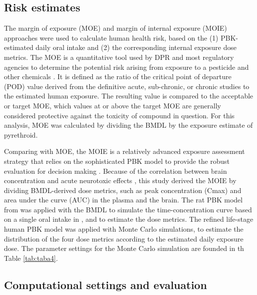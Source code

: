 \documentclass[toxics,article,submit,pdftex,moreauthors]{Definitions/mdpi}
\begin{document}
\subsection{Risk estimates}\label{risk-estimates}

The margin of exposure (MOE) and margin of internal exposure (MOIE)
approaches were used to calculate human health risk, based on the (1)
PBK-estimated daily oral intake and (2) the corresponding internal
exposure dose metrics. The MOE is a quantitative tool used by DPR and
most regulatory agencies to determine the potential risk arising from
exposure to a pesticide and other chemicals
\citep{beaudouin2010stochastic, beauvais_human_2010}. It is defined as
the ratio of the critical point of departure (POD) value derived from
the definitive acute, sub-chronic, or chronic studies to the estimated
human exposure. The resulting value is compared to the acceptable or
target MOE, which values at or above the target MOE are generally
considered protective against the toxicity of compound in question. For
this analysis, MOE was calculated by dividing the BMDL by the exposure
estimate of pyrethroid.

Comparing with MOE, the MOIE is a relatively advanced exposure
assessment strategy that relies on the sophisticated PBK model to
provide the robust evaluation for decision making
\citep{bessems_margin_2017}. Because of the correlation between brain
concentration and acute neurotoxic effects
\citep{scollon_correlation_2011}, this study derived the MOIE by
dividing BMDL-derived dose metrics, such as peak concentration (Cmax)
and area under the curve (AUC) in the plasma and the brain. The rat PBK
model from \citet{song2019evaluation} was applied with the BMDL to
simulate the time-concentration curve based on a single oral intake in
\citet{wolansky_relative_2006}, and to estimate the dose metrics. The
refined life-stage human PBK model was applied with Monte Carlo
simulations, to estimate the distribution of the four dose metrics
according to the estimated daily exposure dose. The parameter settings
for the Monte Carlo simulation are founded in th Table \ref{tab:taba4}.

\subsection{Computational settings and
evaluation}\label{computational-settings-and-evaluation}
\end{document}
